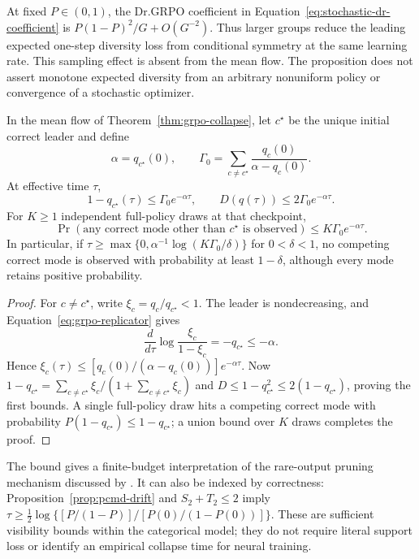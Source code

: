 At fixed $P\in(0,1)$, the Dr.GRPO coefficient in
Equation~\eqref{eq:stochastic-dr-coefficient} is
$P(1-P)^2/G+O(G^{-2})$. Thus larger groups reduce the leading expected
one-step diversity loss from conditional symmetry at the same learning rate.
This sampling effect is absent from the mean flow. The proposition does not
assert monotone expected diversity from an arbitrary nonuniform policy or
convergence of a stochastic optimizer.

\begin{corollary}
\enforcehalffinalproseline
\label{cor:finite-budget-invisibility}
In the mean flow of Theorem~\ref{thm:grpo-collapse}, let $c^\star$ be the
unique initial correct leader and define
\[
 \alpha=q_{c^\star}(0),
 \qquad
 \Gamma_0=\sum_{c\ne c^\star}
             \frac{q_c(0)}{\alpha-q_c(0)}.
\]
At effective time $\tau$,
\begin{equation}
 1-q_{c^\star}(\tau)\le\Gamma_0e^{-\alpha\tau},
 \qquad D(q(\tau))\le2\Gamma_0e^{-\alpha\tau}.
 \label{eq:finite-minority-bound}
\end{equation}
For $K\ge1$ independent full-policy draws at that checkpoint,
\begin{equation}
 \Pr(\text{any correct mode other than }c^\star\text{ is observed})
 \le K\Gamma_0e^{-\alpha\tau}.
 \label{eq:finite-inference-visibility}
\end{equation}
In particular, if
$\tau\ge\max\{0,\alpha^{-1}\log(K\Gamma_0/\delta)\}$ for
$0<\delta<1$, no competing correct mode is observed with probability at
least $1-\delta$, although every mode retains positive probability.
\end{corollary}

\begin{proof}
\enforcehalffinalproseline
For $c\ne c^\star$, write $\xi_c=q_c/q_{c^\star}<1$.
The leader is nondecreasing, and Equation~\eqref{eq:grpo-replicator} gives
\[
 \frac{d}{d\tau}\log\frac{\xi_c}{1-\xi_c}
 =-q_{c^\star}\le-\alpha.
\]
Hence
$\xi_c(\tau)\le[q_c(0)/(\alpha-q_c(0))]e^{-\alpha\tau}$.
Now $1-q_{c^\star}=\sum_{c\ne c^\star}\xi_c/(1+\sum_{c\ne c^\star}\xi_c)$
and $D\le1-q_{c^\star}^2\le2(1-q_{c^\star})$, proving the first bounds.
A single full-policy draw hits a competing correct mode with probability
$P(1-q_{c^\star})\le1-q_{c^\star}$; a union bound over $K$ draws completes
the proof.
\end{proof}

The bound gives a finite-budget interpretation of the rare-output pruning
mechanism discussed by \citet[Section~4.2.5]{lochab2026ucpo}.
It can also be indexed by correctness: Proposition~\ref{prop:pcmd-drift}
and $S_2+T_2\le2$ imply
$\tau\ge\tfrac12\log\{[P/(1-P)]/[P(0)/(1-P(0))]\}$.
These are sufficient visibility bounds within the categorical model;
they do not require literal support loss or identify an empirical collapse
time for neural training.


